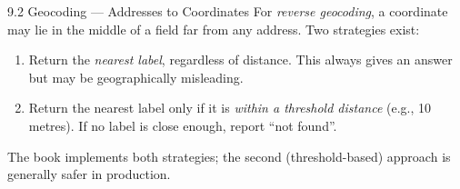 \documentclass[aspectratio=169,10pt]{beamer}
\begin{document}
\begin{frame}[allowframebreaks]{9.2 Geocoding --- Addresses to Coordinates}
  \medskip
  For \emph{reverse geocoding}, a coordinate may lie in the middle of a field
  far from any address.  Two strategies exist:
  \begin{enumerate}
    \item Return the \emph{nearest label}, regardless of distance.  This
          always gives an answer but may be geographically misleading.
    \item Return the nearest label only if it is \emph{within a threshold
          distance} (e.g., 10 metres).  If no label is close enough, report
          ``not found''.
  \end{enumerate}
  The book implements both strategies; the second (threshold-based) approach
  is generally safer in production.

\end{frame}
\end{document}
